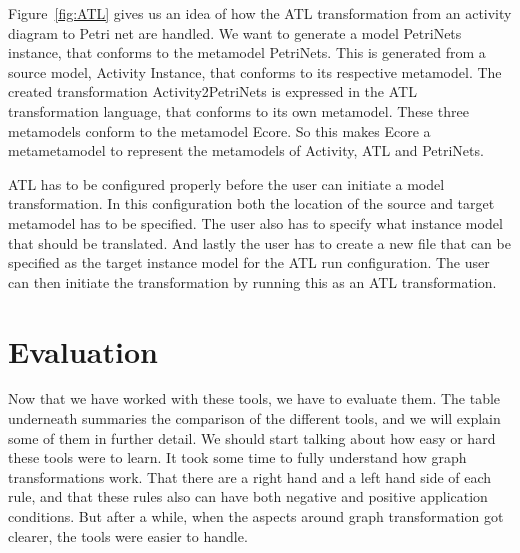 \documentclass[pdftex,11pt,a4paper]{article}
\begin{document}
Figure~\ref{fig:ATL} gives us an idea of how the ATL transformation from an activity
diagram to Petri net are handled. We want to generate a model PetriNets
instance, that conforms to the metamodel PetriNets. This is generated from a
source model, Activity Instance, that conforms to its respective metamodel.
The created transformation Activity2PetriNets is expressed in the ATL
transformation  language, that conforms to its own metamodel. These three
metamodels conform to the metamodel Ecore. So this makes Ecore a metametamodel
to represent the metamodels of Activity, ATL and PetriNets.

ATL has to be configured properly before the user can initiate a model
transformation. In this configuration both the location of the source and target
metamodel has to be specified. The user also has to specify what instance model
that should be translated. And lastly the user has to create a new file that can
be specified as the target instance model for the ATL run configuration. The
user can then initiate the transformation by running this as an ATL
transformation.

\section{Evaluation}
\noindent
Now that we have worked with these tools, we have to evaluate them.
The table underneath summaries the comparison of the different tools, and we
will explain some of them in further detail. We should start talking about how
easy or hard these tools were to learn. It took some time to fully understand
how graph transformations work. That there are a right hand and a left hand
side of each rule, and that these rules also can have both negative and
positive application conditions. But after a while, when the aspects around
graph transformation got clearer, the tools were easier to handle. 
\end{document}
